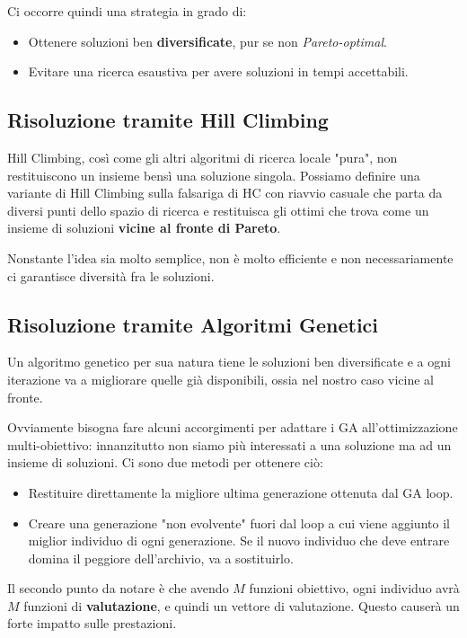         Ci occorre quindi una strategia in grado di:
        \begin{itemize}
            \item Ottenere soluzioni ben \textbf{diversificate}, pur se non \textit{Pareto-optimal}.
            \item Evitare una ricerca esaustiva per avere soluzioni in tempi accettabili.
        \end{itemize}
        
    \subsection{Risoluzione tramite Hill Climbing}
        Hill Climbing, così come gli altri algoritmi di ricerca locale "pura", non restituiscono un insieme bensì una soluzione singola. Possiamo definire una variante di Hill Climbing sulla falsariga di HC con riavvio casuale che parta da diversi punti dello spazio di ricerca e restituisca gli ottimi che trova come un insieme di soluzioni \textbf{vicine al fronte di Pareto}.
        
        Nonstante l'idea sia molto semplice, non è molto efficiente e non necessariamente ci garantisce diversità fra le soluzioni.
        
    \subsection{Risoluzione tramite Algoritmi Genetici}
        Un algoritmo genetico per sua natura tiene le soluzioni ben diversificate e a ogni iterazione va a migliorare quelle già disponibili, ossia nel nostro caso vicine al fronte.
        
        Ovviamente bisogna fare alcuni accorgimenti per adattare i GA all'ottimizzazione multi-obiettivo: innanzitutto non siamo più interessati a una soluzione ma ad un insieme di soluzioni. Ci sono due metodi per ottenere ciò:
        \begin{itemize}
            \item Restituire direttamente la migliore ultima generazione ottenuta dal GA loop.
            \item Creare una generazione "non evolvente" fuori dal loop a cui viene aggiunto il miglior individuo di ogni generazione. Se il nuovo individuo che deve entrare domina il peggiore dell'archivio, va a sostituirlo.
        \end{itemize}
        
        Il secondo punto da notare è che avendo $M$ funzioni obiettivo, ogni individuo avrà $M$ funzioni di \textbf{valutazione}, e quindi un vettore di valutazione. Questo causerà un forte impatto sulle prestazioni.
        
